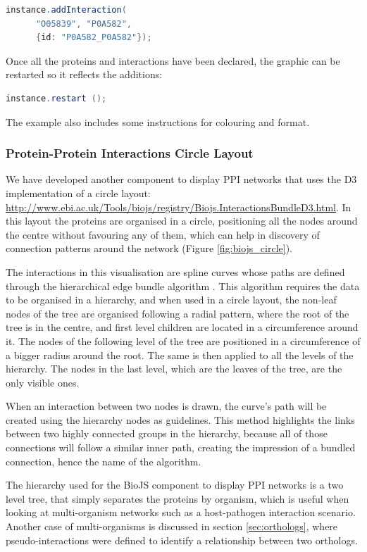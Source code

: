\begin{lstlisting}[language=java]
instance.addInteraction(
      "O05839", "P0A582",
      {id: "P0A582_P0A582"}); 
\end{lstlisting}
					
Once all the proteins and interactions have been declared, the graphic can be restarted so it reflects the additions:

\begin{lstlisting}[language=java]
instance.restart ();
\end{lstlisting}

The example also includes some instructions for colouring and format. 


\subsubsection{Protein-Protein Interactions Circle Layout} \label{subsubsec:ppi2_biojs}
We have developed another component to display PPI networks that uses the D3 implementation of a circle layout: \url{http://www.ebi.ac.uk/Tools/biojs/registry/Biojs.InteractionsBundleD3.html}. In this layout the proteins are organised in a circle, positioning all the nodes around the centre without favouring any of them, which can help in discovery of connection patterns around the network (Figure \ref{fig:biojs_circle}). 

The interactions in this visualisation are spline curves whose paths are defined through the hierarchical edge bundle algorithm \cite{HOL2006}. This algorithm requires the data to be organised in a hierarchy, and when used in a circle layout, the non-leaf nodes of the tree are organised following a radial pattern, where the root of the tree is in the centre, and first level children are located in a circumference around it. The nodes of the following level of the tree are positioned in a circumference of a bigger radius around the root. The same is then applied to all the levels of the hierarchy. The nodes in the last level, which are the leaves of the tree, are the only visible ones.

When an interaction between two nodes is drawn, the curve's path will be created using the hierarchy nodes as guidelines. This method highlights the links between two highly connected groups in the hierarchy, because all of those connections will follow a similar inner path, creating the impression of a bundled connection, hence the name of the algorithm.

The hierarchy used for the BioJS component to display PPI networks is a two level tree, that simply separates the proteins by organism, which is useful when looking at multi-organism networks such as a host-pathogen interaction scenario. Another case of multi-organisms is discussed in section \ref{sec:orthologs}, where pseudo-interactions were defined to identify a relationship between two orthologs.

